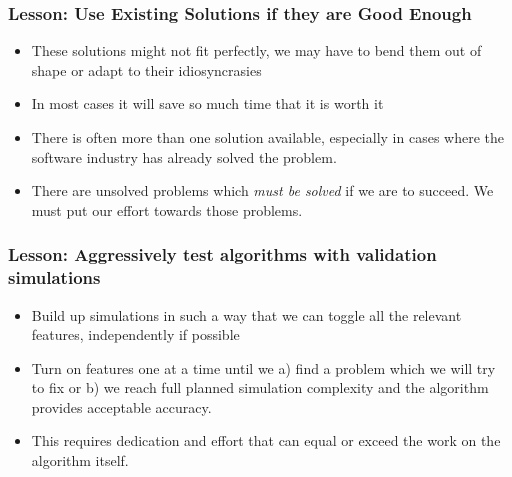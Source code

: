 \documentclass{beamer}
\begin{document}
\frame
{
    \frametitle{Lesson: Use Existing Solutions if they are Good Enough}


    \begin{itemize}

        \item These solutions might not fit perfectly, we may have to bend
            them out of shape or adapt to their idiosyncrasies

        \item In most cases it will save so much time that it is worth it

        \item There is often more than one solution available, especially in
            cases where the software industry has already solved the problem.

        \item There are unsolved problems which {\em must be solved} if we are
            to succeed.  We must put our effort towards those problems.

    \end{itemize}

}

\frame
{
    \frametitle{Lesson: Aggressively test algorithms with validation simulations}


    \begin{itemize}

        \item Build up simulations in such a way that we can toggle all the
            relevant features, independently if possible

        \item Turn on features one at a time until we a) find a problem which we
            will try to fix or b) we reach full planned simulation complexity
            and the algorithm provides acceptable accuracy.

        \item This requires dedication and effort that can equal or
            exceed the
            work on the algorithm itself.

    \end{itemize}

}
\end{document}
